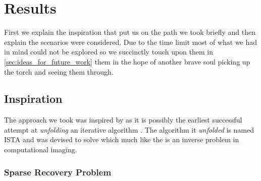 \chapter{Results}\label{ch:results}

First we explain the inspiration that put us on the path we took briefly and then explain the scenarios were considered. 
Due to the time limit most of what we had in mind could not be explored so we succinctly touch upon them in \cref{sec:ideas_for_future_work} them in the hope of another 
brave soul picking up the torch and seeing them through.  

\section{Inspiration}

The approach we took was inspired by \cite{Gregor2010} as it is possibly the earliest successful attempt at \emph{unfolding}
an iterative algorithm \cite{Monga2019}. The algorithm it \emph{unfolded} is named \ac{ISTA}\cite{Daubechies2003} and 
was devised to solve \srp\index{\srp} which much like the \pr\cite{Shechtman2015}\cite{Jaganathan2015}\index{\pr} is an 
inverse problem\cite{Kirsch2021} in computational imaging\cite{Khare2023}.
\subsection{Sparse Recovery Problem}

